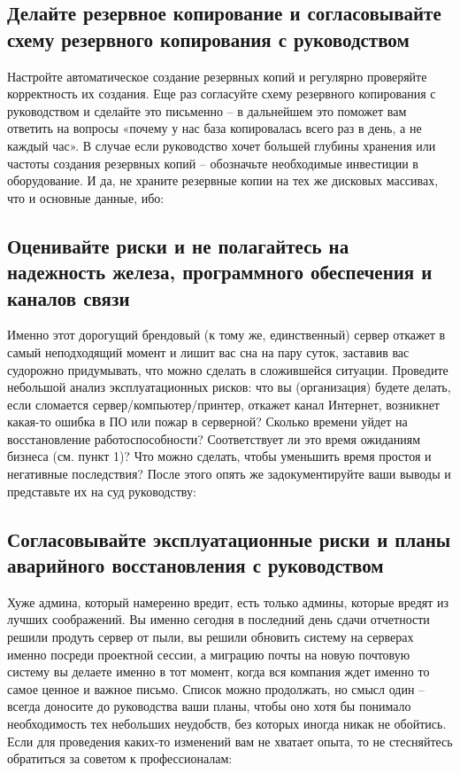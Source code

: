 	\subsection{Делайте резервное копирование и согласовывайте схему резервного копирования с руководством}
	
	Настройте автоматическое создание резервных копий и регулярно проверяйте корректность их создания. Еще раз согласуйте схему резервного копирования с руководством и сделайте это письменно – в дальнейшем это поможет вам ответить на вопросы «почему у нас база копировалась всего раз в день, а не каждый час». В случае если руководство хочет большей глубины хранения или частоты создания резервных копий – обозначьте необходимые инвестиции в оборудование. И да, не храните резервные копии на тех же дисковых массивах, что и основные данные, ибо:
	
	\subsection{Оценивайте риски и не полагайтесь на надежность железа, программного обеспечения и каналов связи}
	
    Именно этот дорогущий брендовый (к тому же, единственный) сервер откажет в самый неподходящий момент и лишит вас сна на пару суток, заставив вас судорожно придумывать, что можно сделать в сложившейся ситуации. Проведите небольшой анализ эксплуатационных рисков: что вы (организация) будете делать, если сломается сервер/компьютер/принтер, откажет канал Интернет, возникнет какая-то ошибка в ПО или пожар в серверной? Сколько времени уйдет на восстановление работоспособности? Соответствует ли это время ожиданиям бизнеса (см. пункт 1)? Что можно сделать, чтобы уменьшить время простоя и негативные последствия? После этого опять же задокументируйте ваши выводы и представьте их на суд руководству:
    
    \subsection{Согласовывайте эксплуатационные риски и планы аварийного восстановления с руководством}
	
	Хуже админа, который намеренно вредит, есть только админы, которые вредят из лучших соображений. Вы именно сегодня в последний день сдачи отчетности решили продуть сервер от пыли, вы решили обновить систему на серверах именно посреди проектной сессии, а миграцию почты на новую почтовую систему вы делаете именно в тот момент, когда вся компания ждет именно то самое ценное и важное письмо. Список можно продолжать, но смысл один – всегда доносите до руководства ваши планы, чтобы оно хотя бы понимало необходимость тех небольших неудобств, без которых иногда никак не обойтись. Если для проведения каких-то изменений вам не хватает опыта, то не стесняйтесь обратиться за советом к профессионалам:
	
